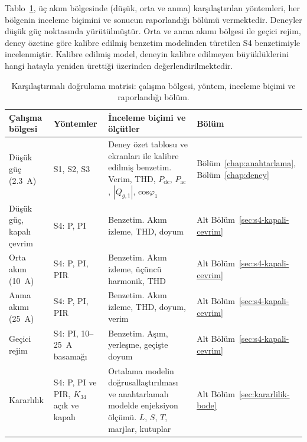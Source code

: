 Tablo~\ref{tab:dogrulama-matrisi}, üç akım bölgesinde (düşük, orta ve anma) karşılaştırılan yöntemleri, her bölgenin inceleme biçimini ve sonucun raporlandığı bölümü vermektedir. Deneyler düşük güç noktasında yürütülmüştür. Orta ve anma akımı bölgesi ile geçici rejim, deney özetine göre kalibre edilmiş benzetim modelinden türetilen S4 benzetimiyle incelenmiştir. Kalibre edilmiş model, deneyin kalibre edilmeyen büyüklüklerini hangi hatayla yeniden ürettiği üzerinden değerlendirilmektedir.

\begin{table}[H]
  \centering
  \caption{Karşılaştırmalı doğrulama matrisi: çalışma bölgesi, yöntem, inceleme biçimi ve raporlandığı bölüm.}
  \label{tab:dogrulama-matrisi}
  \small
  \begin{tabularx}{\textwidth}{p{} p{} X p{}}
    \toprule
    Çalışma bölgesi & Yöntemler & İnceleme biçimi ve ölçütler & Bölüm \\
    \midrule
    Düşük güç (\SI{2.3}{\ampere}) & S1, S2, S3 & Deney özet tablosu ve ekranları ile kalibre edilmiş benzetim. Verim, THD, $P_{\mathrm{dc}}$, $P_{\mathrm{ac}}$, $|Q_{g,1}|$, cos$\varphi_1$ & Bölüm~\ref{chap:anahtarlama}, Bölüm~\ref{chap:deney} \\
    Düşük güç, kapalı çevrim & S4: P, PI & Benzetim. Akım izleme, THD, doyum & Alt Bölüm~\ref{sec:s4-kapali-cevrim} \\
    Orta akım (\SI{10}{\ampere}) & S4: P, PI, PIR & Benzetim. Akım izleme, üçüncü harmonik, THD & Alt Bölüm~\ref{sec:s4-kapali-cevrim} \\
    Anma akımı (\SI{25}{\ampere}) & S4: P, PI, PIR & Benzetim. Akım izleme, THD, doyum, verim & Alt Bölüm~\ref{sec:s4-kapali-cevrim} \\
    Geçici rejim & S4: PI, \num{10}--\SI{25}{\ampere} basamağı & Benzetim. Aşım, yerleşme, geçişte doyum & Alt Bölüm~\ref{sec:s4-kapali-cevrim} \\
    Kararlılık & S4: P, PI ve PIR, $K_{34}$ açık ve kapalı & Ortalama modelin doğrusallaştırılması ve anahtarlamalı modelde enjeksiyon ölçümü. $L$, $S$, $T$, marjlar, kutuplar & Alt Bölüm~\ref{sec:kararlilik-bode} \\
    \bottomrule
  \end{tabularx}
\end{table}

